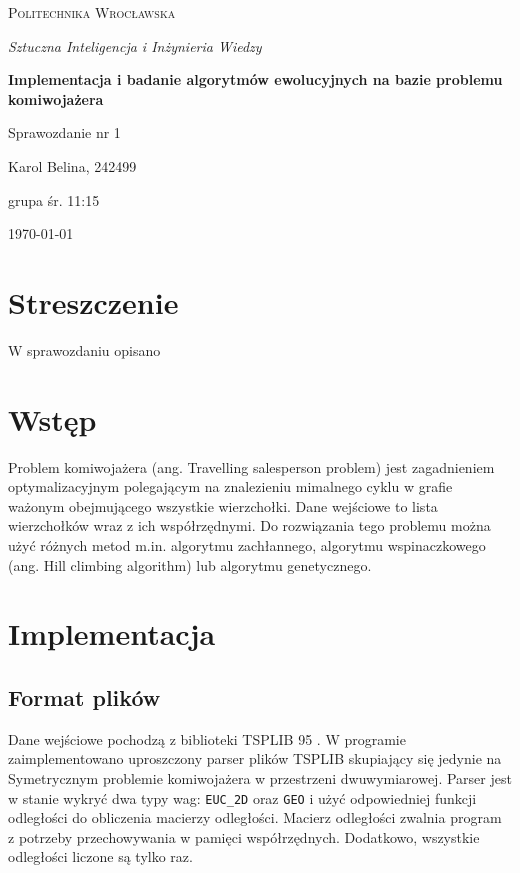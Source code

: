 \documentclass[12pt,a4paper]{article}
\begin{document}
\begin{titlepage}
  \centering
  \vspace*{2cm}
  {\scshape\large Politechnika Wrocławska \par}
  \vspace{1cm}
  {\itshape\large Sztuczna Inteligencja i Inżynieria Wiedzy\par}
  \vspace{1.5cm}
  {\LARGE\bfseries Implementacja i badanie algorytmów ewolucyjnych na bazie problemu komiwojażera\par}
  \vspace{1cm}
  {\Large Sprawozdanie nr 1\par}
  \vfill
  {\large Karol Belina, 242499\par grupa śr. 11:15}
  \vfill
  {\large \today\par}
\end{titlepage}

\tableofcontents

\section*{Streszczenie}

W sprawozdaniu opisano

\section{Wstęp}

Problem komiwojażera (ang. Travelling salesperson problem) jest zagadnieniem optymalizacyjnym polegającym na znalezieniu mimalnego cyklu w grafie ważonym obejmującego wszystkie wierzchołki. Dane wejściowe to lista wierzchołków wraz z ich współrzędnymi. Do rozwiązania tego problemu można użyć różnych metod m.in. algorytmu zachłannego, algorytmu wspinaczkowego (ang. Hill climbing algorithm) lub algorytmu genetycznego.

\section{Implementacja}

\subsection{Format plików}

Dane wejściowe pochodzą z biblioteki TSPLIB 95 \cite{tsplib95}. W programie zaimplementowano uproszczony parser plików TSPLIB skupiający się jedynie na Symetrycznym problemie komiwojażera w przestrzeni dwuwymiarowej. Parser jest w stanie wykryć dwa typy wag: \verb|EUC_2D| oraz \verb|GEO| i użyć odpowiedniej funkcji odległości do obliczenia macierzy odległości. Macierz odległości zwalnia program z potrzeby przechowywania w pamięci współrzędnych. Dodatkowo, wszystkie odległości liczone są tylko raz.
\end{document}
